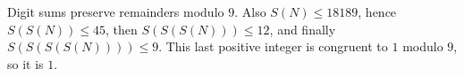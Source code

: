 Digit sums preserve remainders modulo $9$. Also $S(N)\le18189$, hence $S(S(N))\le45$, then $S(S(S(N)))\le12$, and finally $S(S(S(S(N))))\le9$. This last positive integer is congruent to $1$ modulo $9$, so it is $\boxed1$.
